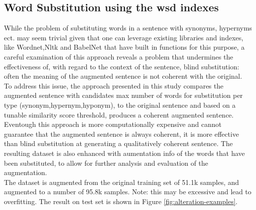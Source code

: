 \documentclass[11pt,a4paper]{article}
\begin{document}
\subsection{Word Substitution using the wsd indexes}
While the problem of substituting words in a sentence with synonyms, hypernyms ect. may seem trivial given that one can leverage existing 
libraries and indexes, like Wordnet,Nltk and BabelNet that have built in functions for this purpose, a careful examination of this approach reveals a problem
that undermines the effectiveness of, with regard to the context of the sentence, blind substitution: often the meaning of the augmented sentence is not coherent with the original.
\\To address this issue, the approach presented in this study compares the augmented sentence with candidates max number of words for substitution per type (synonym,hypernym,hyponym), to the original sentence
and based on a tunable similarity score threshold, produces a coherent augmented sentence.
\\Eventough this approach is more computationally expensive and cannot guarantee that the augmented sentence is always coherent, it is more effective than blind substitution at generating a qualitatively coherent sentence.
The resulting dataset is also enhanced with aumentation info of the words that have been substituted, to allow for further analysis and evaluation of the augmentation.
\\The dataset is augmented from the original training set of 51.1k samples, and augmented to a number of 95.8k samples. Note: this may be excessive and lead to overfitting.
The result on test set is shown in Figure \ref{fig:alteration-examples}.
\end{document}
